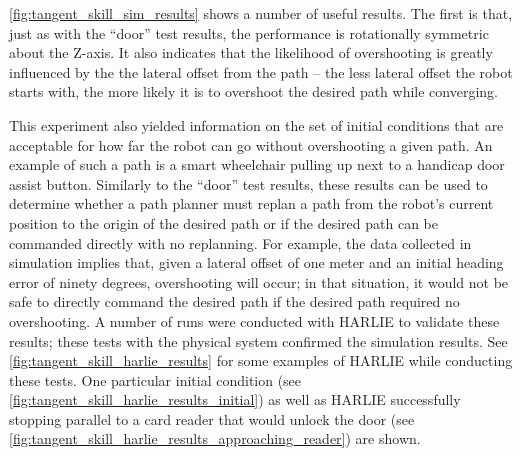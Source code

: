 \autoref{fig:tangent_skill_sim_results} shows a number of useful results. The first is that, just as with the ``door'' test results, the performance is rotationally symmetric about the Z-axis. It also indicates that the likelihood of overshooting is greatly influenced by the the lateral offset from the path -- the less lateral offset the robot starts with, the more likely it is to overshoot the desired path while converging.

This experiment also yielded information on the set of initial conditions that are acceptable for how far the robot can go without overshooting a given path. An example of such a path is a smart wheelchair pulling up next to a handicap door assist button. Similarly to the ``door'' test results, these results can be used to determine whether a path planner must replan a path from the robot's current position to the origin of the desired path or if the desired path can be commanded directly with no replanning. For example, the data collected in simulation implies that, given a lateral offset of one meter and an initial heading error of ninety degrees, overshooting will occur; in that situation, it would not be safe to directly command the desired path if the desired path required no overshooting. A number of runs were conducted with HARLIE to validate these results; these tests with the physical system confirmed the simulation results. See \autoref{fig:tangent_skill_harlie_results} for some examples of HARLIE while conducting these tests. One particular initial condition (see \autoref{fig:tangent_skill_harlie_results_initial}) as well as HARLIE successfully stopping parallel to a card reader that would unlock the door (see \autoref{fig:tangent_skill_harlie_results_approaching_reader}) are shown.

